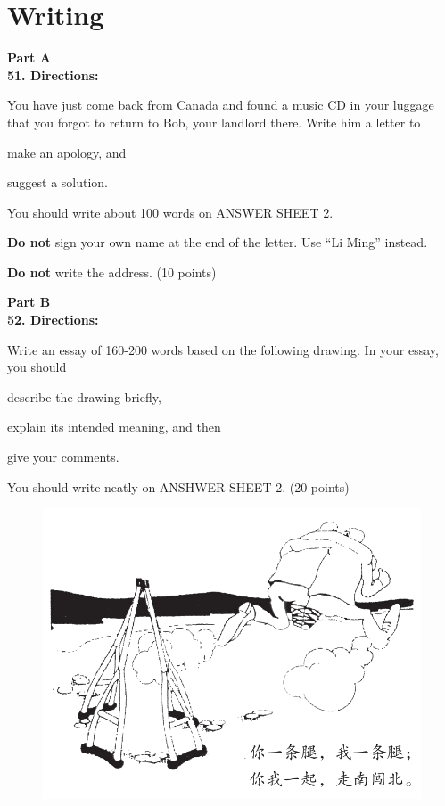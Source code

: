 \newpage

\section{Writing}


\noindent
\textbf{Part A}\\
\textbf{51. Directions:}

You have just come back from Canada and found a music CD
in your luggage that you forgot to return to Bob, your landlord there.
Write him a letter to
\begin{listwrite}
	\item
 make an apology, and

\item 
suggest a solution.
\end{listwrite}

You should write about 100 words on ANSWER SHEET 2.

\textbf{Do not} sign your own name at the end of the letter. Use ``Li
Ming'' instead.

\textbf{Do not} write the address. (10 points)

\vspace{2em}


\noindent
\textbf{Part B}\\
\textbf{52. Directions:}

Write an essay of 160-200 words based on the following drawing. In your
essay, you should
\begin{listwrite}
	\item
 describe the drawing briefly,

\item 
explain its intended meaning, and then

\item 
give your comments.
\end{listwrite}

You should write neatly on ANSHWER SHEET 2. (20 points)



\begin{figure}[h!]
	\centering
	\includegraphics[width=0.54\linewidth]{picture/2008.png}
\end{figure}

\checkpagenumber